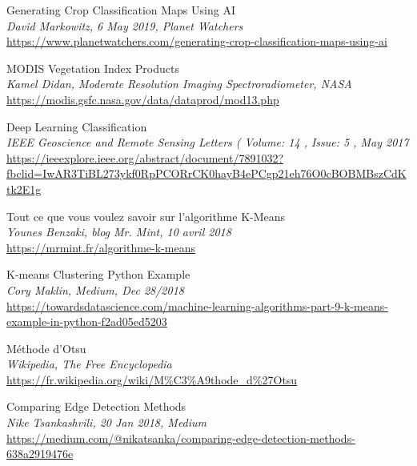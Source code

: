\documentclass[12pt, openany]{report}
\begin{document}
\begin{thebibliography}{9}
Generating Crop Classification Maps Using AI\\
\textit{David Markowitz, 6 May 2019, Planet Watchers}\\
\url{https://www.planetwatchers.com/generating-crop-classification-maps-using-ai}

MODIS Vegetation Index Products\\
\textit{Kamel Didan, Moderate Resolution Imaging Spectroradiometer, NASA}\\
\url{https://modis.gsfc.nasa.gov/data/dataprod/mod13.php}

Deep Learning Classification\\
\textit{ IEEE Geoscience and Remote Sensing Letters ( Volume: 14 , Issue: 5 , May 2017 }\\
\url{https://ieeexplore.ieee.org/abstract/document/7891032?fbclid=IwAR3TiBL273ykf0RpPCORrCK0hayB4ePCgp21eh76O0cBOBMBszCdKtk2E1g}

Tout ce que vous voulez savoir sur l’algorithme K-Means\\
\textit{Younes Benzaki, blog Mr. Mint,  10 avril 2018}\\
\url{https://mrmint.fr/algorithme-k-means}


K-means Clustering Python Example\\
\textit{Cory Maklin, Medium, Dec 28/2018}\\
\url{https://towardsdatascience.com/machine-learning-algorithms-part-9-k-means-example-in-python-f2ad05ed5203}

Méthode d'Otsu\\
\textit{{W}ikipedia{,} The Free Encyclopedia}\\
\url{https://fr.wikipedia.org/wiki/M\%C3\%A9thode_d\%27Otsu}

Comparing Edge Detection Methods\\
\textit{Nike Tsankashvili, 20 Jan 2018, Medium}\\
\url{https://medium.com/@nikatsanka/comparing-edge-detection-methods-638a2919476e}




\end{thebibliography}
\end{document}

